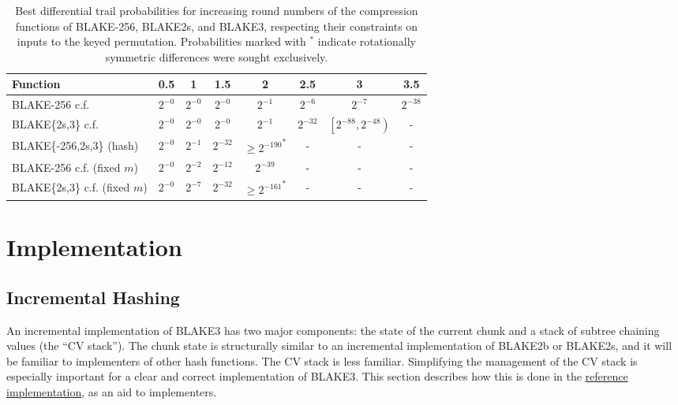 \documentclass[11pt,notitlepage,a4paper]{article}
\begin{document}
\begin{table}[t]
  \centering
  \caption{Best differential trail probabilities for increasing round numbers of the compression functions of BLAKE-256, BLAKE2s, and BLAKE3, respecting their constraints on inputs to the keyed permutation. Probabilities marked with ${}^\ast$ indicate rotationally symmetric differences were sought exclusively.}%
  \label{tab:trails}
  \begin{tabular}{lccccccc}
    \toprule
    Function & 0.5   & 1     & 1.5   & 2     & 2.5   & 3     & 3.5 \\ \midrule
    BLAKE-256 c.f. & $2^{-0}$ & $2^{-0}$ & $2^{-0}$ & $2^{-1}$ & $2^{-6}$ & $2^{-7}$ & $2^{-38}$  \\
    BLAKE\{2s,3\} c.f.   &  $2^{-0}$  & $2^{-0}$ &  $2^{-0}$  & $2^{-1}$ & $2^{-32}$   & $\left[2^{-88}, 2^{-48}\right)$ & -  \\
    BLAKE\{-256,2s,3\} (hash) & $2^{-0}$ & $2^{-1}$ & $2^{-32}$ & ${\ge 2^{-190}}^\ast$ & - & - & -  \\ %
    BLAKE-256 c.f. (fixed $m$) & $2^{-0}$ & $2^{-2}$ & $2^{-12}$ & $2^{-39}$ & - & - & - \\
    BLAKE\{2s,3\} c.f. (fixed $m$) & $2^{-0}$ & $2^{-7}$ & $2^{-32}$ & ${\ge 2^{-161}}^\ast$ & - & - & - \\ %
    \bottomrule
  \end{tabular}
\end{table}

\section{Implementation}\label{sec:implementation}

\subsection{Incremental Hashing}\label{sec:incremental}

An incremental implementation of BLAKE3 has two major components: the state of
the current chunk and a stack of subtree chaining values (the ``CV stack'').
The chunk state is structurally similar to an incremental implementation of
BLAKE2b or BLAKE2s, and it will be familiar to implementers of other hash
functions. The CV stack is less familiar. Simplifying the management of the CV
stack is especially important for a clear and correct implementation of BLAKE3.
This section describes how this is done in the
\href{https://github.com/veorq/BLAKE3/blob/master/reference_impl/reference_impl.rs}{reference
implementation}, as an aid to implementers.
\end{document}
